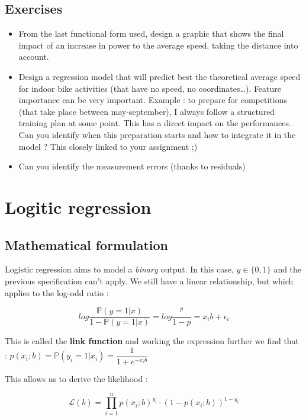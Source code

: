 \documentclass[
]{book}
\providecommand{\tightlist}{%
  \setlength{\itemsep}{0pt}\setlength{\parskip}{0pt}}
\begin{document}
\hypertarget{exercises}{%
\subsection{Exercises}\label{exercises}}

\begin{itemize}
\tightlist
\item
  From the last functional form used, design a graphic that shows the final impact of an increase in power to the average speed, taking the distance into account.
\item
  Design a regression model that will predict best the theoretical average speed for indoor bike activities (that have no speed, no coordinates\ldots). Feature importance can be very important. Example : to prepare for competitions (that take place between may-september), I always follow a structured training plan at some point. This has a direct impact on the performances. Can you identify when this preparation starts and how to integrate it in the model ? This closely linked to your assignment ;)
\item
  Can you identify the measurement errors (thanks to residuals)
\end{itemize}

\hypertarget{logitic-regression}{%
\section{Logitic regression}\label{logitic-regression}}

\hypertarget{mathematical-formulation}{%
\subsection{Mathematical formulation}\label{mathematical-formulation}}

Logistic regression aims to model a \emph{binary} output. In this case, \(y \in \{0,1\}\) and the previous specification can't apply. We still have a linear relationship, but which applies to the log-odd ratio :

\[log \dfrac{\mathbb{P}(y=1|x)}{1-\mathbb{P}(y=1|x)} = log \dfrac{^p}{1-p} = x_ib + \epsilon_i\]

This is called the \textbf{link function} and working the expression further we find that : \(p(x_i;b) = \mathbb{P}(y_i=1|x_i) = \dfrac{1}{1+e^{-x_ib}}\)

This allows us to derive the likelihood :

\[\mathcal{L}(b) = \prod_{i=1}^n p(x_i;b)^{y_i} \cdot (1-p(x_i;b))^{1-y_i}\]
\end{document}
